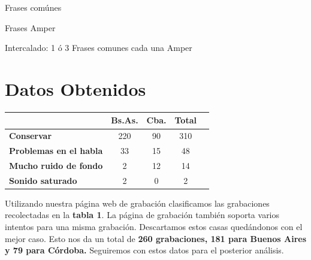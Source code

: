 \documentclass[a0,portrait]{a0poster}
\begin{document}
\begin{multicols}{2}
	
	\begin{multicols}{2}
		 Frases comúnes
		
		 Frases Amper
	\end{multicols}	
	
Intercalado: 1 ó 3 Frases comunes cada una Amper


\section*{Datos Obtenidos}

\begin{table}
	\begin{tabular}{l c c c c}
		\toprule
		\textbf{}  & \textbf{Bs.As. } & \textbf{Cba.} & \textbf{Total} \\ 
		\midrule
		\textbf{Conservar}  & 220 & 90 & 310 \\ 
		\textbf{Problemas en el habla}  & 33 & 15 & 48 \\ 
		\textbf{Mucho ruido de fondo}  & 2 & 12 & 14 \\ 
		\textbf{Sonido saturado}  & 2 & 0 & 2 \\ 
		\bottomrule
	\end{tabular}
\end{table}

\large Utilizando nuestra página web de grabación clasificamos las grabaciones recolectadas en la \textbf{tabla 1}. La página de grabación también soporta varios intentos para una misma grabación. Descartamos estos casas quedándonos con el mejor caso.
Esto nos da un total de \textbf{260 grabaciones, 181 para Buenos Aires y 79 para Córdoba.} Seguiremos con estos datos para el posterior análisis.


\end{multicols}
\end{document}
